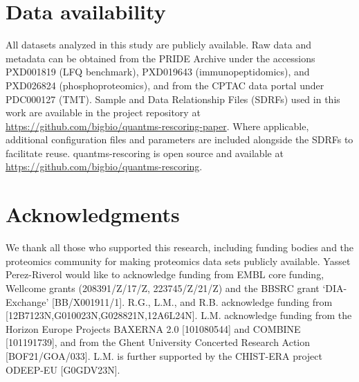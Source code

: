 \documentclass[12pt]{article}
\begin{document}
\section*{Data availability}
All datasets analyzed in this study are publicly available. Raw data and metadata can be obtained from the PRIDE Archive under the accessions PXD001819 (LFQ benchmark), PXD019643 (immunopeptidomics), and PXD026824 (phosphoproteomics), and from the CPTAC data portal under PDC000127 (TMT). Sample and Data Relationship Files (SDRFs) used in this work are available in the project repository at \url{https://github.com/bigbio/quantms-rescoring-paper}. Where applicable, additional configuration files and parameters are included alongside the SDRFs to facilitate reuse. quantms-rescoring is open source and available at \url{https://github.com/bigbio/quantms-rescoring}.

\section*{Acknowledgments}
We thank all those who supported this research, including funding bodies and the proteomics community for making proteomics data sets publicly available. 
Yasset Perez-Riverol would like to acknowledge funding from EMBL core funding, Wellcome grants (208391/Z/17/Z, 223745/Z/21/Z) and the BBSRC grant ‘DIA-Exchange’ [BB/X001911/1].
R.G., L.M., and R.B. acknowledge funding from [12B7123N,G010023N,G028821N,12A6L24N]. L.M. acknowledge funding from the Horizon Europe Projects BAXERNA 2.0 [101080544] and COMBINE [101191739], and from the Ghent University Concerted Research Action [BOF21/GOA/033]. L.M. is further supported by the CHIST-ERA project ODEEP-EU [G0GDV23N].



\end{document}
